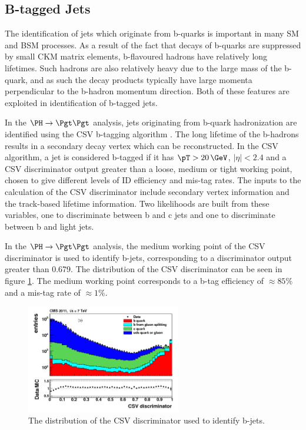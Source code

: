 \subsection{B-tagged Jets}
\label{sec:btag}

The identification of jets which originate from b-quarks is important in many
\ac{SM} and \ac{BSM} processes. As a result of the fact that decays of b-quarks
are suppressed by small CKM matrix elements, b-flavoured hadrons have relatively
long lifetimes. Such hadrons are also relatively heavy due to the large mass of
the b-quark, and as such the decay products typically have large momenta
perpendicular to the b-hadron momentum direction. Both of these features are
exploited in identification of b-tagged jets.

In the $\PH \to \Pgt\Pgt$ analysis, jets originating from b-quark
hadronization are identified using the \ac{CSV} b-tagging
algorithm \cite{bjets}. The long lifetime of the b-hadrons results in a
secondary decay vertex which can be reconstructed. In the \ac{CSV} algorithm, a
jet is considered b-tagged if it has $\pT>20\,\GeV$, $|\eta|<2.4$ and a
\ac{CSV} discriminator output greater than a loose, medium or tight working
point, chosen to give different levels of ID efficiency and mis-tag rates. The
inputs to the calculation of the \ac{CSV} discriminator include secondary
vertex information and the track-based lifetime information. Two likelihoods are
built from these variables, one to discriminate between b and c jets and one to
discriminate between b and light jets. 

In the $\PH\to\Pgt\Pgt$ analysis, the medium working point of the \ac{CSV}
discriminator is used to identify b-jets, corresponding to a discriminator
output greater than 0.679. The distribution of the \ac{CSV} discriminator 
can be seen in figure \ref{fig:csv}. The medium working point corresponds to a
b-tag efficiency of $\approx 85\%$ and a mis-tag rate of $\approx 1\%$. 

\begin{figure}
\begin{center}
    \includegraphics[width=0.6\textwidth]
      {plots/reco/csv.png}
\end{center}
\caption{
The distribution of the \ac{CSV} discriminator used to identify b-jets.    
}
\label{fig:csv}
\end{figure}


